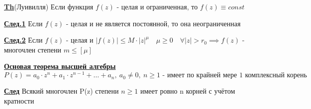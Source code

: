 \documentclass[a4paper]{article}
\begin{document}
\begin{tcolorbox}
\textbf{\underline{Th}}(Луивилля) Если функция $ f(z) $ - целая и ограниченная,
то $ f(z) \equiv const $ 

\textbf{\underline{След.1}} Если $ f(z) $ - целая и не является постоянной, то она
неограниченная

\textbf{\underline{След.2}} Если $ f(z) $ - целая и $ |f(z)| \leq M \cdot |z|^{\mu}
\quad \mu \geq 0 \quad \forall |z| > r_0 \implies f(z) $ - многочлен степени
$ m \leq [\mu] $ 
\end{tcolorbox}

\begin{tcolorbox}
\textbf{\underline{Основая теорема высшей алгебры}}
\[
    P(z) = a_0 \cdot z ^{n} + a_1 \cdot z^{n-1} + \dots + a_{n}, \ a_0 \neq 0, \
    n \geq 1 \text{ - имеет по крайней мере 1 комплексный корень}
\]

\textbf{\underline{След}} Всякий многочлен P(z) степени $ n \geq 1 $ имеет
ровно n корней с учётом кратности
\end{tcolorbox}
\end{document}
